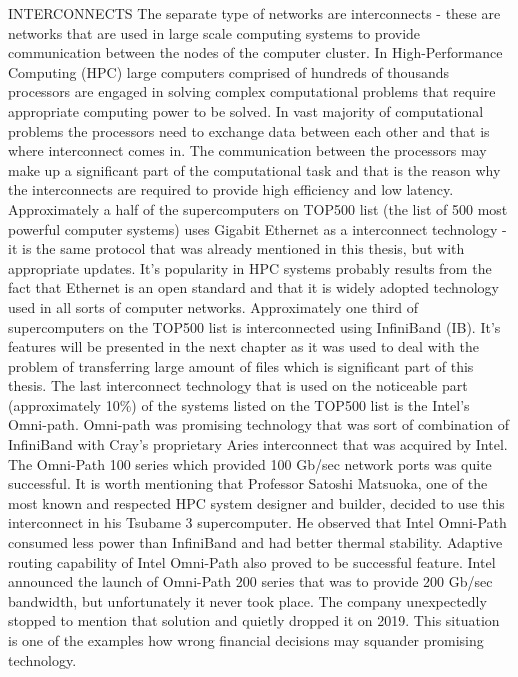 \documentclass[magisterska,en]{pracamgr}
\begin{document}
INTERCONNECTS
The separate type of networks are interconnects - these are networks that are used in large scale computing systems to provide communication between the nodes of the computer cluster. In High-Performance Computing (HPC) large computers comprised of hundreds of thousands processors are engaged in solving complex computational problems that require appropriate computing power to be solved. In vast majority of computational problems the processors need to exchange data between each other and that is where interconnect comes in. The communication between the processors may make up a significant part of the computational task and that is the reason why the interconnects are required to provide high efficiency and low latency. Approximately a half of the supercomputers on TOP500 list (the list of 500 most powerful computer systems) uses Gigabit Ethernet as a interconnect technology - it is the same protocol that was already mentioned in this thesis, but with appropriate updates. It's popularity in HPC systems probably results from the fact that Ethernet is an open standard and that it is widely adopted technology used in all sorts of computer networks. Approximately one third of supercomputers on the TOP500 list is interconnected using InfiniBand (IB). It's features will be presented in the next chapter as it was used to deal with the problem of transferring large amount of files which is significant part of this thesis. The last interconnect technology that is used on the noticeable part (approximately 10\%) of the systems listed on the TOP500 list is the Intel's Omni-path.\cite{top500_list} Omni-path was promising technology that was sort of combination of InfiniBand with Cray's proprietary Aries interconnect that was acquired by Intel. \cite{intel_leave_omnipath} The Omni-Path 100 series which provided 100 Gb/sec network ports was quite successful. It is worth mentioning that Professor Satoshi Matsuoka, one of the most known and respected HPC system designer and builder, decided to use this interconnect in his Tsubame 3 supercomputer. He observed that Intel Omni-Path consumed less power than InfiniBand and had better thermal stability. Adaptive routing capability of Intel Omni-Path also proved to be successful feature. \cite{tsubame3_omnipath} Intel announced the launch of Omni-Path 200 series that was to provide 200 Gb/sec bandwidth, but unfortunately it never took place. The company unexpectedly stopped to mention that solution and quietly dropped it on 2019. \cite{intel_leave_omnipath} This situation is one of the examples how wrong financial decisions may squander promising technology.
\end{document}
